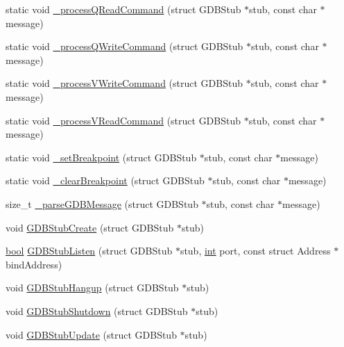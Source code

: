 \begin{DoxyCompactItemize}
static void \mbox{\hyperlink{gdb-stub_8c_ab15c73fbee09b784e5989c520d65c002}{\+\_\+process\+Q\+Read\+Command}} (struct G\+D\+B\+Stub $\ast$stub, const char $\ast$message)
\item 
static void \mbox{\hyperlink{gdb-stub_8c_a34a7a41e3881752f1882a6edccd6edce}{\+\_\+process\+Q\+Write\+Command}} (struct G\+D\+B\+Stub $\ast$stub, const char $\ast$message)
\item 
static void \mbox{\hyperlink{gdb-stub_8c_a582e9560a7cedd1a58761398f1761a0d}{\+\_\+process\+V\+Write\+Command}} (struct G\+D\+B\+Stub $\ast$stub, const char $\ast$message)
\item 
static void \mbox{\hyperlink{gdb-stub_8c_a28273f2230ac620b2972bd50b2e6e6a9}{\+\_\+process\+V\+Read\+Command}} (struct G\+D\+B\+Stub $\ast$stub, const char $\ast$message)
\item 
static void \mbox{\hyperlink{gdb-stub_8c_a20d837c8c41a03d7d12d2af71302514f}{\+\_\+set\+Breakpoint}} (struct G\+D\+B\+Stub $\ast$stub, const char $\ast$message)
\item 
static void \mbox{\hyperlink{gdb-stub_8c_a53d57d6dc1ec038bf80e8e8c9bd1f6a8}{\+\_\+clear\+Breakpoint}} (struct G\+D\+B\+Stub $\ast$stub, const char $\ast$message)
\item 
size\+\_\+t \mbox{\hyperlink{gdb-stub_8c_ac8630a52d935a21513afd3f0d14ffe90}{\+\_\+parse\+G\+D\+B\+Message}} (struct G\+D\+B\+Stub $\ast$stub, const char $\ast$message)
\item 
void \mbox{\hyperlink{gdb-stub_8c_a22597ba75b0b4cfd482b774f19d0200a}{G\+D\+B\+Stub\+Create}} (struct G\+D\+B\+Stub $\ast$stub)
\item 
\mbox{\hyperlink{libretro_8h_a4a26dcae73fb7e1528214a068aca317e}{bool}} \mbox{\hyperlink{gdb-stub_8c_a0ccf43b868dd63e4eb34e327a7b16816}{G\+D\+B\+Stub\+Listen}} (struct G\+D\+B\+Stub $\ast$stub, \mbox{\hyperlink{ioapi_8h_a787fa3cf048117ba7123753c1e74fcd6}{int}} port, const struct Address $\ast$bind\+Address)
\item 
void \mbox{\hyperlink{gdb-stub_8c_a28c1b7ad1cc9e5dbf3a8204d45ee2813}{G\+D\+B\+Stub\+Hangup}} (struct G\+D\+B\+Stub $\ast$stub)
\item 
void \mbox{\hyperlink{gdb-stub_8c_abe19ef8bb5b906d431db62458f3b5c5f}{G\+D\+B\+Stub\+Shutdown}} (struct G\+D\+B\+Stub $\ast$stub)
\item 
void \mbox{\hyperlink{gdb-stub_8c_a258a1ad74baac2ecfadeab0d1e07e3b0}{G\+D\+B\+Stub\+Update}} (struct G\+D\+B\+Stub $\ast$stub)
\end{DoxyCompactItemize}


